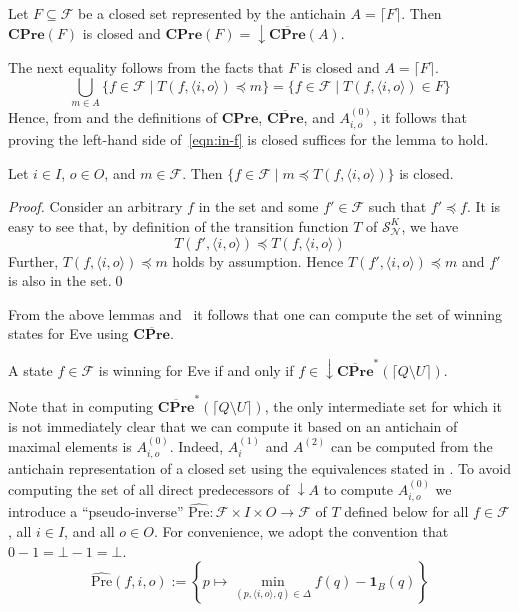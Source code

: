 \documentclass[runningheads,a4paper,draft]{llncs}
\newcommand{\indicator}[2]{\mathbf{1}_{#1}(#2)}
\newcommand{\cpre}{\mathbf{CPre}}
\newcommand{\eve}{Eve\xspace}
\newcommand{\calF}{\mathcal{F}}
\newcommand{\calN}{\mathcal{N}}
\newcommand{\calS}{\mathcal{S}}
\newcommand{\closedn}[1]{\mathrm{\downarrow} #1}
\newcommand{\pseudopre}{\widehat{\mathrm{Pre}}}
\begin{document}
\begin{lemma}
  Let $F \subseteq \calF$ be a closed set represented by the antichain $A =
  \lceil F \rceil$. Then $\cpre(F)$ is closed and
  \(
    \cpre(F) = \closedn{\overline{\cpre}(A)}.
  \)
\end{lemma}
The next equality follows from the facts that
$F$ is closed and $A = \lceil F \rceil$.
\begin{equation}\label{eqn:in-f}
  \bigcup_{m \in A} \{ f \in \calF \mid T(f, \langle i,o \rangle) \preceq m
  \}
  =
  \{f \in \calF \mid T(f,\langle i, o \rangle) \in F\}
\end{equation}
Hence, from  and the definitions of $\cpre$,
$\overline{\cpre}$, and $A^{(0)}_{i,o}$, it follows that proving
the left-hand side of~\eqref{eqn:in-f} is closed suffices for the lemma to
hold.
\begin{lemma}\label{lem:closed-pre}
  Let $i \in I$, $o \in O$, and $m \in \calF$.  Then $\{f \in \calF \mid m
  \preceq T(f, \langle i,o \rangle) \}$ is closed.
\end{lemma}
\begin{proof}
  Consider an arbitrary $f$ in the set and some $f' \in \calF$ such that $f'
  \preceq f$. It is easy to see that, by definition of the transition
  function $T$ of $\calS^K_\calN$, we have 
  \[ 
    T(f',\langle i, o \rangle) \preceq T(f,\langle i, o \rangle)
  \]
  Further, $T(f,\langle i, o \rangle) \preceq m$ holds by assumption. Hence
  \(T(f', \langle i, o \rangle) \preceq m\) and $f'$ is also in the set.\qed
\end{proof}

From the above lemmas and~ it follows that one can
compute the set of winning states for \eve using $\overline{\cpre}$.
\begin{theorem}
  A state $f \in \calF$ is winning for \eve if and only if $f \in
  \closedn{\overline{\cpre}^*(\lceil Q \setminus U \rceil)}$.
\end{theorem}

Note that in computing $\overline{\cpre}^*(\lceil Q \setminus U \rceil)$, the only
intermediate set for which it is not immediately clear that we can compute it
based on an antichain of maximal elements is $A^{(0)}_{i,o}$. Indeed,
$A^{(1)}_i$ and $A^{(2)}$ can be computed from the antichain representation of
a closed set using the equivalences stated in . To avoid
computing the set of all direct predecessors of $\closedn{A}$ to compute
$A^{(0)}_{i,o}$ we introduce a ``pseudo-inverse'' $\pseudopre : \calF \times I
\times O \to \calF$ of $T$ defined below for all $f \in \calF$, all $i \in I$,
and all $o \in O$. For convenience, we adopt the convention that $0 - 1 = \bot
- 1 = \bot$.
\[
  \pseudopre(f,i,o) := \left\{ p \mapsto
    \min_{(p,\langle i, o \rangle,q) \in \Delta} f(q) -
    \indicator{B}{q} \right\}
\]
\end{document}
